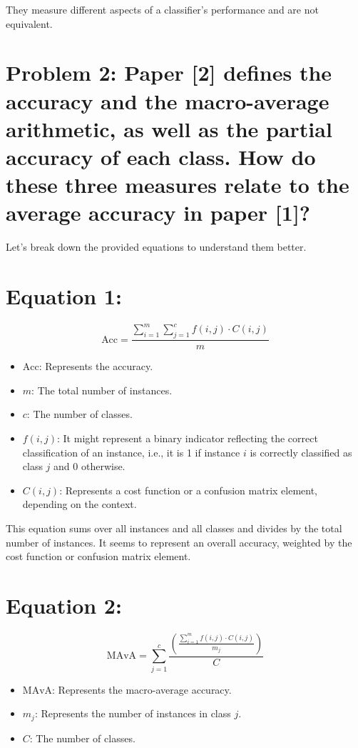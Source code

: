 \documentclass{article}
\begin{document}
They measure different aspects of a classifier's performance and are not equivalent.



\section{Problem 2: Paper [2] defines the accuracy and the macro-average arithmetic, as well as the partial
accuracy of each class. How do these three measures relate to the average accuracy in
paper [1]? }

Let's break down the provided equations to understand them better.

\section*{Equation 1:}
\begin{equation}
    \text{Acc} = \frac{\sum_{i=1}^{m} \sum_{j=1}^{c} f(i, j) \cdot C(i, j)}{m}
\end{equation}
\begin{itemize}
    \item \( \text{Acc} \): Represents the accuracy.
    \item \( m \): The total number of instances.
    \item \( c \): The number of classes.
    \item \( f(i, j) \): It might represent a binary indicator reflecting the correct classification of an instance, i.e., it is 1 if instance \( i \) is correctly classified as class \( j \) and 0 otherwise.
    \item \( C(i, j) \): Represents a cost function or a confusion matrix element, depending on the context.
\end{itemize}

This equation sums over all instances and all classes and divides by the total number of instances. It seems to represent an overall accuracy, weighted by the cost function or confusion matrix element.

\section*{Equation 2:}
\begin{equation}
    \text{MAvA} = \sum_{j=1}^{c} \frac{ \left( \frac{\sum_{i=1}^{m} f(i, j) \cdot C(i, j)}{m_j} \right)}{C}
\end{equation}
\begin{itemize}
    \item \( \text{MAvA} \): Represents the macro-average accuracy.
    \item \( m_j \): Represents the number of instances in class \( j \).
    \item \( C \): The number of classes.
\end{itemize}
\end{document}
